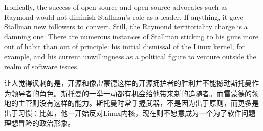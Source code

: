 

\ifdefined\eng
Ironically, the success of open source and open source advocates such as Raymond would not diminish Stallman's role as a leader. If anything, it gave Stallman new followers to convert. Still, the Raymond territoriality charge is a damning one. There are numerous instances of Stallman sticking to his guns more out of habit than out of principle: his initial dismissal of the Linux kernel, for example, and his current unwillingness as a political figure to venture outside the realm of software issues.
\fi

\ifdefined\chs
让人觉得讽刺的是，开源和像雷蒙德这样的开源拥护者的胜利并不能撼动斯托曼作为领导者的角色。斯托曼的一举一动都有机会给他带来新的追随者。而雷蒙德的领地的主管则没有这样的能力。斯托曼时常手握武器，不是因为出于原则，而更多是出于习惯：比如，他一开始反对Linux内核，现在则不愿意成为一个为了软件问题理想冒险的政治形象。
\fi


